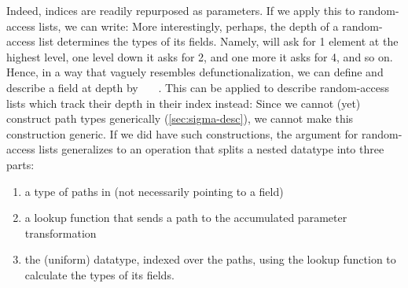\begin{appendix}
Indeed, indices are readily repurposed as parameters. If we apply this to random-access lists, we can write:
More interestingly, perhaps, the depth of a random-access list determines the types of its fields. Namely,  will ask for 1 element at the highest level, one level down it asks for 2, and one more it asks for 4, and so on. Hence, in a way that vaguely resembles defunctionalization, we can define
and describe a field at depth  by \ \ \ . This can be applied to describe random-access lists which track their depth in their index instead:
Since we cannot (yet) construct path types generically (\autoref{sec:sigma-desc}), we cannot make this construction generic. If we did have such constructions, the argument for random-access lists generalizes to an operation that splits a nested datatype  into three parts:
\begin{enumerate}
    \item a type of paths in  (not necessarily pointing to a field)
    \item a lookup function that sends a path to the accumulated parameter transformation
    \item the (uniform) datatype, indexed over the paths, using the lookup function to calculate the types of its fields.
\end{enumerate}
\end{appendix}